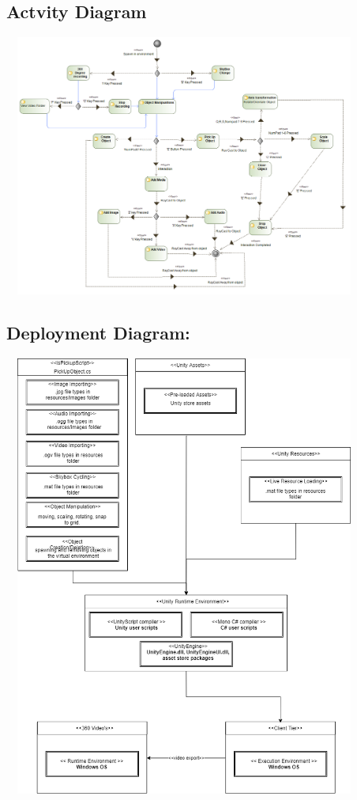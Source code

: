 \documentclass{article}
\begin{document}
    \subsection{Actvity Diagram}
  	\includegraphics[width=450px,height=325px]{ActivityDiagram.png}

  	\subsection{Deployment Diagram:}
  	\includegraphics[width=450px,height=550px]{DeploymentDiagram.png}
\end{document}
